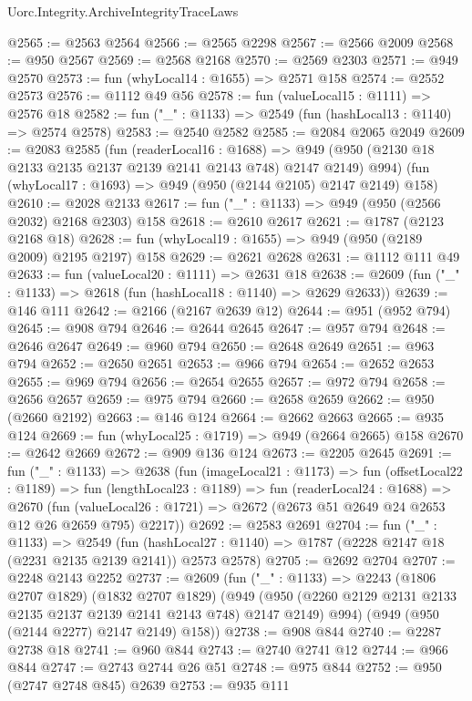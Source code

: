 \begin{lexlean}{Uorc.Integrity.ArchiveIntegrityTraceLaws}
\begin{coremodule}
@2565 := @2563 @2564
@2566 := @2565 @2298
@2567 := @2566 @2009
@2568 := @950 @2567
@2569 := @2568 @2168
@2570 := @2569 @2303
@2571 := @949 @2570
@2573 := fun (whyLocal14 : @1655) => @2571 @158
@2574 := @2552 @2573
@2576 := @1112 @49 @56
@2578 := fun (valueLocal15 : @1111) => @2576 @18
@2582 := fun ("_" : @1133) => @2549 (fun (hashLocal13 : @1140) => @2574 @2578)
@2583 := @2540 @2582
@2585 := @2084 @2065 @2049
@2609 := @2083
    @2585
    (fun (readerLocal16 : @1688) =>
    @949 (@950 (@2130 @18 @2133 @2135 @2137 @2139 @2141 @2143 @748) @2147 @2149) @994)
    (fun (whyLocal17 : @1693) => @949 (@950 (@2144 @2105) @2147 @2149) @158)
@2610 := @2028 @2133
@2617 := fun ("_" : @1133) => @949 (@950 (@2566 @2032) @2168 @2303) @158
@2618 := @2610 @2617
@2621 := @1787 (@2123 @2168 @18)
@2628 := fun (whyLocal19 : @1655) => @949 (@950 (@2189 @2009) @2195 @2197) @158
@2629 := @2621 @2628
@2631 := @1112 @111 @49
@2633 := fun (valueLocal20 : @1111) => @2631 @18
@2638 := @2609 (fun ("_" : @1133) => @2618 (fun (hashLocal18 : @1140) => @2629 @2633))
@2639 := @146 @111
@2642 := @2166 (@2167 @2639 @12)
@2644 := @951 (@952 @794)
@2645 := @908 @794
@2646 := @2644 @2645
@2647 := @957 @794
@2648 := @2646 @2647
@2649 := @960 @794
@2650 := @2648 @2649
@2651 := @963 @794
@2652 := @2650 @2651
@2653 := @966 @794
@2654 := @2652 @2653
@2655 := @969 @794
@2656 := @2654 @2655
@2657 := @972 @794
@2658 := @2656 @2657
@2659 := @975 @794
@2660 := @2658 @2659
@2662 := @950 (@2660 @2192)
@2663 := @146 @124
@2664 := @2662 @2663
@2665 := @935 @124
@2669 := fun (whyLocal25 : @1719) => @949 (@2664 @2665) @158
@2670 := @2642 @2669
@2672 := @909 @136 @124
@2673 := @2205 @2645
@2691 := fun ("_" : @1133) =>
  @2638
    (fun (imageLocal21 : @1173) =>
    fun (offsetLocal22 : @1189) =>
    fun (lengthLocal23 : @1189) =>
    fun (readerLocal24 : @1688) =>
    @2670
      (fun (valueLocal26 : @1721) => @2672 (@2673 @51 @2649 @24 @2653 @12 @26 @2659 @795) @2217))
@2692 := @2583 @2691
@2704 := fun ("_" : @1133) =>
  @2549 (fun (hashLocal27 : @1140) => @1787 (@2228 @2147 @18 (@2231 @2135 @2139 @2141)) @2573 @2578)
@2705 := @2692 @2704
@2707 := @2248 @2143 @2252
@2737 := @2609
    (fun ("_" : @1133) =>
    @2243
      (@1806 @2707 @1829)
      (@1832 @2707 @1829)
      (@949 (@950 (@2260 @2129 @2131 @2133 @2135 @2137 @2139 @2141 @2143 @748) @2147 @2149) @994)
      (@949 (@950 (@2144 @2277) @2147 @2149) @158))
@2738 := @908 @844
@2740 := @2287 @2738 @18
@2741 := @960 @844
@2743 := @2740 @2741 @12
@2744 := @966 @844
@2747 := @2743 @2744 @26 @51
@2748 := @975 @844
@2752 := @950 (@2747 @2748 @845) @2639
@2753 := @935 @111

\end{coremodule}
\end{lexlean}
